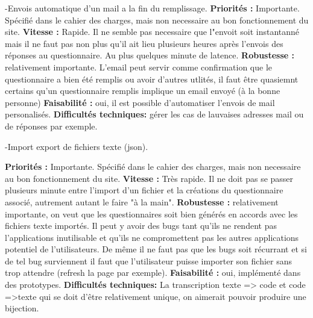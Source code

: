 \documentclass{article}
\begin{document}
-Envois automatique d'un mail a la fin du remplissage.\newline
\textbf{Priorités : }Importante. Spécifié dans le cahier des charges, mais non necessaire au bon fonctionnement du site.  \newline
\textbf{Vitesse : }Rapide. Il ne semble pas necessaire que l"envoit soit instantanné mais il ne faut pas non plus qu'il ait lieu plusieurs heures après l'envois des réponses au questionnaire. Au plus quelques minute de latence.\newline
\textbf{Robustesse : } relativement importante. L'email peut servir comme confirmation que le questionnaire a bien été remplis ou avoir d'autres utlités, il faut être quasiemnt certains qu'un questionnaire remplis implique un email envoyé (à la bonne personne)\newline
\textbf{Faisabilité : }oui, il est possible d'automatiser l'envois de mail personalisés.\newline
\textbf{Difficultés techniques: } gérer les cas de lauvaises adresses mail ou de réponses par exemple.\newline

-Import export de fichiers texte (json).\newline

\textbf{Priorités : }Importante. Spécifié dans le cahier des charges, mais non necessaire au bon fonctionnement du site. \newline
\textbf{Vitesse : }Très rapide. Il ne doit pas se passer plusieurs minute entre l'import d'un fichier et la créations du questionnaire associé, autrement autant le faire "à la main".\newline
\textbf{Robustesse : }relativement importante, on veut que les questionnaires soit bien générés en accords avec les fichiers texte importés. Il peut y avoir des bugs tant qu'ils ne rendent pas l'applications inutilisable et qu'ils ne compromettent pas les autres applications potentiel de l'utilisateurs. De même il ne faut pas que les bugs soit récurrant et si de tel bug surviennent il faut que l'utilisateur puisse importer son fichier sans trop attendre (refresh la page par exemple). \newline
\textbf{Faisabilité : }oui, implémenté dans des prototypes.\newline
\textbf{Difficultés techniques: } La transcription texte => code et code =>texte qui se doit d'être relativement unique, on aimerait pouvoir produire une bijection.\newline
\end{document}
